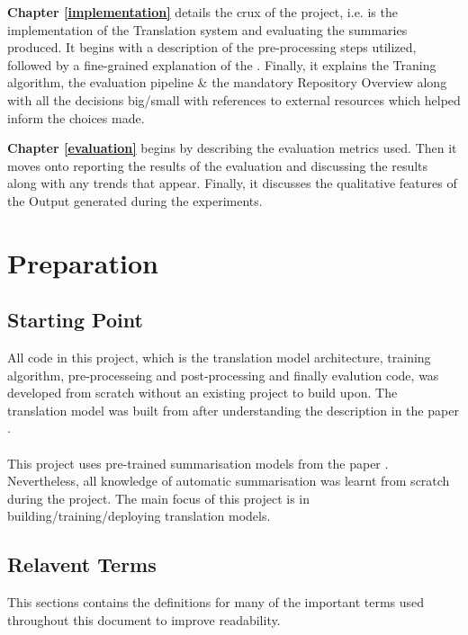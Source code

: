 \documentclass[12pt,a4paper,twoside,openright]{report}
\newcommand{\red}[1]{\textcolor{red}{#1}}
\begin{document}
\textbf{Chapter \ref{implementation} } details the crux of the project, i.e. is the implementation of the Translation system and evaluating the summaries produced. It begins with a description of the pre-processing steps utilized, followed by a fine-grained explanation of the . Finally, it explains the Traning algorithm, the evaluation pipeline \& the mandatory Repository Overview along with all the decisions big/small with references to external resources which helped inform the choices made.

\textbf{Chapter \ref{evaluation} }
begins by describing the evaluation metrics used. Then it moves onto reporting the results of the evaluation and discussing the results along with any trends that appear. Finally, it discusses the qualitative features of the Output generated during the experiments.



\chapter{Preparation}
\label{preperation}

\section{Starting Point}
\label{starting-point}
All code in this project, which is the translation model architecture, training algorithm, pre-processeing and post-processing and finally evalution code, was developed from scratch without an existing project to build upon. The translation model was built from after understanding the description in the paper \cite{transformers}.
\\\\
This project uses pre-trained summarisation models from the paper \cite{summary}. Nevertheless, all knowledge of automatic summarisation was learnt from scratch during the project. The main focus of this project is in building/training/deploying translation models.

\section{Relavent Terms}
This sections contains the definitions for many of the important terms used throughout this document to improve readability.
\end{document}
